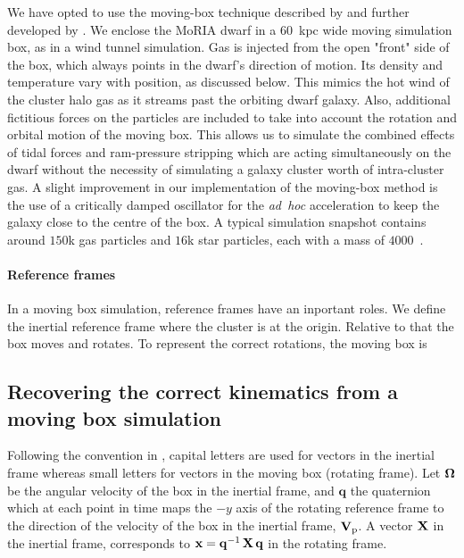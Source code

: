 We have opted to use the moving-box technique described by \citet{Nichols2015} and further developed by \citet{Hausammann2019}.
We enclose the MoRIA dwarf in a $60$~kpc wide moving simulation box, as in a wind tunnel simulation.
Gas is injected from the open "front" side of the box, which always points in the dwarf's direction of motion. Its density and temperature vary with position, as discussed below. This mimics the hot wind of the cluster halo gas as it streams past the orbiting dwarf galaxy.
Also, additional fictitious forces on the particles are included to take into account the rotation and orbital motion of the moving box.
This allows us to simulate the combined effects of tidal forces and ram-pressure stripping \citep[as studied by][]{Mayer2006} which are acting simultaneously on the dwarf without the necessity of simulating a galaxy cluster worth of intra-cluster gas.
A slight improvement in our implementation of the moving-box method is the use of a critically damped oscillator for the \emph{ad~hoc} acceleration to keep the galaxy close to the centre of the box.
A typical simulation snapshot contains around $150$k gas particles and $16$k star particles, each with a mass of $4000$~\Msun{}.

\paragraph{Reference frames} In a moving box simulation, reference frames have an inportant roles.
We define the inertial reference frame where the cluster is at the origin.
Relative to that the box moves and rotates.
To represent the correct rotations, the moving box is 


\subsection{Recovering the correct kinematics from a moving box simulation}
\label{sec:corret_kinematics}
Following the convention in \citet{Nichols2015}, capital letters are used for vectors in the inertial frame whereas small letters for vectors in the moving box (rotating frame).
Let $\boldsymbol{\mathbf{\Omega}}$ be the angular velocity of the box in the inertial frame, and $\mathbf q$ the quaternion which at each point in time maps the $-y$ axis of the rotating reference frame to the direction of the velocity of the box in the inertial frame, $\mathbf{V}_{\mathrm p}$.
A vector $\boldsymbol{\mathbf{X}}$ in the inertial frame, corresponds to $\boldsymbol{\mathbf{x}} = \mathbf q^{-1}\, \boldsymbol{\mathbf{X}} \,\mathbf q $ in the rotating frame.

